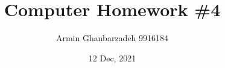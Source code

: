 %
%


\documentclass[
	12pt, %
]{packages/fphw}




\title{Computer Homework \#4} %

\author{Armin Ghanbarzadeh 9916184} %

\date{12 Dec, 2021} %

